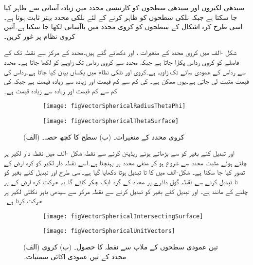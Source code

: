 سیدھی لکیروں اور سیدھی سطحوں کو کارتیسی محدد میں زیادہ آسانی سے ظاہر کیا جا سکتا ہے جبکہ نلکی سطحوں کو ظاہر کرنے کے لئے نلکی محدد بہتر ثابت ہوتا ہے۔اسی طرح کرہ اشکال کے سطحوں کو کروی محدد میں باآسانی لکھا جا سکتا ہے۔آئیں کروی نظام پر غور کریں۔

شکل -الف میں کروی محدد کے متغیرات ،  اور  دکھائے گئے ہیں۔محدد کے مرکز سے نقطہ  تک کے فاصلے  کو کروی رداس پکارا جاتا ہے جبکہ  محدد سے کروی رداس تک زاویے کو  لکھا جاتا ہے۔ محدد سے رداس کے عمودی سائے تک زاویہ  ہے۔کروی اور نلکی نظام میں  یکساں بیان کیا جاتا ہے۔رداس کی  قیمت مثبت لی جاتی ہے۔یوں  ممکن ہے۔ کی کم سے کم قیمت  اور  زیادہ سے زیادہ  قیمت  ہے جبکہ  کی کم سے کم قیمت  اور زیادہ سے زیادہ قیمت  ہے۔

\begin{figure}
\centering
\begin{subfigure}{0.4\textwidth}
\centering
\texttt{[image: figVectorSphericalRadiusThetaPhi]}
\end{subfigure}%
%
\begin{subfigure}{0.4\textwidth}
\centering
\texttt{[image: figVectorSphericalThetaSurface]}
\end{subfigure}%
\caption{(الف) کروی محدد کے متغیرات۔ (ب)  سطح  کا کچھ حصہ۔}
\label{شکل_سمتیہ_کروی_محدد_متغیرات}
\end{figure}
%
 اور  تبدیل کئے بغیر  کو  سے بڑھاتے ہوئے  ریڈیئن  کرنے سے نقطہ   شکل -الف میں نقطہ دار لکیر پر چلتے ہوئے  مثبت  محدد سے شروع ہو کر  منفی  محدد پر پہنچتا ہے۔اسے  نقطہ دار لکیر کو  کرہ ارض کے  تصور  کیا جا سکتا ہے۔  شکل-الف میں  کا  تا  تبدیل ہوتا دکھایا گیا ہے۔اسی طرح  اور  تبدیل کئے بغیر  کو  تا  تبدیل کرنے سے  نقطہ  گول دائرے پر  محدد کے گرد ایک چکر کاٹے گا۔یہ حرکت کرہ ارض کے  پر چلنے کے  مانند ہے۔ اور  تبدیل کئے بغیر  کو تبدیل کرنے سے نقطہ  مرکز سے  سیدھی باہر نکلتی لکیر پر حرکت کرتا ہے۔ 

\begin{figure}
\centering
\begin{subfigure}{0.5\textwidth}
\centering
\texttt{[image: figVectorSphericalIntersectingSurface]}
\end{subfigure}%
%
\begin{subfigure}{0.5\textwidth}
\centering
\texttt{[image: figVectorSphericalUnitVectors]}
\end{subfigure}%
\caption{(الف) تین عمودی سطحوں کے ملاپ سے نقطہ  کا حصول۔ (ب) کروی محدد کے تین عمودی اکائی سمتیات۔}
\label{شکل_سمتیہ_کروی_تین_سطحوں_کا_ملاپ}
\end{figure}

